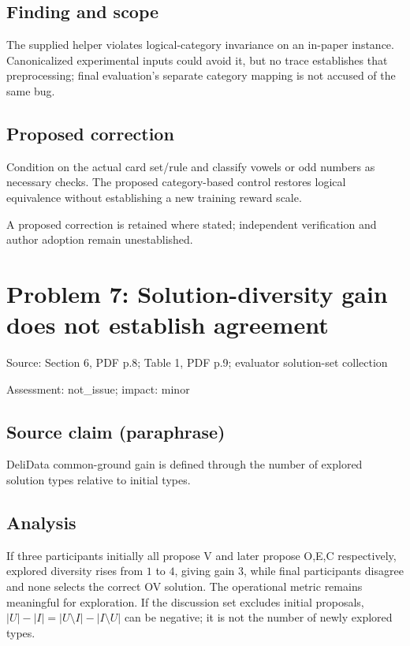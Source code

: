 \documentclass[11pt]{article}
\begin{document}
\subsection*{Finding and scope}

The supplied helper violates logical-category invariance on an in-paper instance. Canonicalized experimental inputs could avoid it, but no trace establishes that preprocessing; final evaluation’s separate category mapping is not accused of the same bug.

\subsection*{Proposed correction}

Condition on the actual card set/rule and classify vowels or odd numbers as necessary checks. The proposed category-based control restores logical equivalence without establishing a new training reward scale.

A proposed correction is retained where stated; independent verification and author adoption remain unestablished.

\section*{Problem 7: Solution-diversity gain does not establish agreement}

Source: Section 6, PDF p.8; Table 1, PDF p.9; evaluator solution-set collection

Assessment: not\_issue; impact: minor

\subsection*{Source claim (paraphrase)}

DeliData common-ground gain is defined through the number of explored solution types relative to initial types.

\subsection*{Analysis}

If three participants initially all propose V and later propose O,E,C respectively, explored diversity rises from \(1\) to \(4\), giving gain \(3\), while final participants disagree and none selects the correct OV solution. The operational metric remains meaningful for exploration. If the discussion set excludes initial proposals, \(|U|-|I|=|U\setminus I|-|I\setminus U|\) can be negative; it is not the number of newly explored types.
\end{document}
